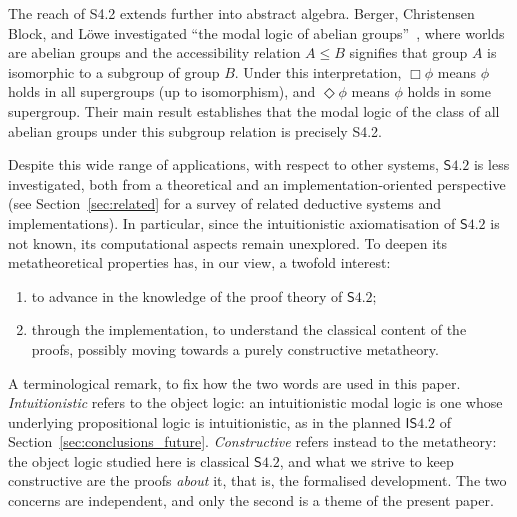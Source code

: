 \documentclass{article}
\newcommand{\spotlighty}[1]{#1}
\newcommand{\logic}{\mathsf{S4.2}}
\theoremstyle{definition}
\begin{document}
The reach of S4.2 extends further into abstract algebra. Berger, Christensen Block, and L\"owe investigated ``the modal logic of abelian groups''~\cite{Berger2023:ModalAbelian}, where worlds are abelian groups and the accessibility relation $A \leq B$ signifies that group $A$ is isomorphic to a subgroup of group $B$. Under this interpretation, $\Box\phi$ means $\phi$ holds in all supergroups (up to isomorphism), and $\Diamond\phi$ means $\phi$ holds in some supergroup. Their main result establishes that the modal logic of the class of all abelian groups under this subgroup relation is precisely S4.2. %

Despite this wide range of applications, with respect to other systems, $\logic$ is less investigated, both from a theoretical and an implementation-oriented perspective (see Section~\ref{sec:related} for a survey of related deductive systems and implementations). In particular, since the intuitionistic axiomatisation of $\logic$ is not known, its computational aspects remain unexplored. To deepen its metatheoretical properties has, in our view, a twofold interest:
\begin{enumerate}
\item\label{item:interest-prooftheory} to advance in the knowledge of the proof theory of $\logic$;
\item\label{item:interest-constructive} through the implementation, to understand the classical content of the proofs, possibly moving towards a purely constructive metatheory.
\end{enumerate}

\spotlighty{A terminological remark, to fix how the two words are used in this paper. \emph{Intuitionistic} refers to the object logic: an intuitionistic modal logic is one whose underlying propositional logic is intuitionistic, as in the planned $\mathsf{I}\logic$ of Section~\ref{sec:conclusions_future}. \emph{Constructive} refers instead to the metatheory: the object logic studied here is classical $\logic$, and what we strive to keep constructive are the proofs \emph{about} it, that is, the formalised development. The two concerns are independent, and only the second is a theme of the present paper.}
\end{document}
